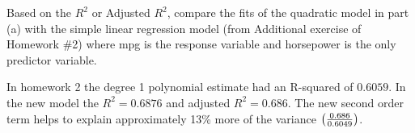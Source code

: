 
Based on the $R^2$ or Adjusted $R^2$, compare the fits of the quadratic model in part (a)
with the simple linear regression model (from Additional exercise of Homework \#2) where mpg
is the response variable and horsepower is the only predictor variable.

\soln*
In homework 2 the degree 1 polynomial estimate had an R-squared of $0.6059$. In the new model the $R^2 = 0.6876$ and adjusted $R^2 = 0.686$. The new second order term helps to explain approximately 13\% more of the variance $\pfrac{0.686}{0.6049}$.